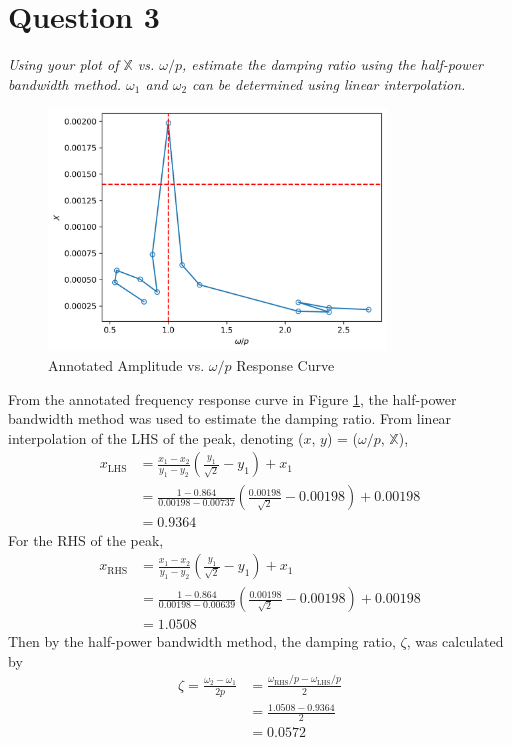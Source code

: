 \section{Question 3}
\textit{Using your plot of $\mathbb{X}$ vs. $\omega/p$, estimate the damping ratio using the half-power bandwidth method. $\omega_1$ and $\omega_2$ can be determined using linear interpolation.}
\begin{figure}[H]
    \centering
    \includegraphics[width=0.8\textwidth]{Questions/Plots/X_vs_omega_p_with_lines.png}
    \caption{Annotated Amplitude vs. $\omega/p$ Response Curve}
    \label{fig:frequency_response_curve_with_lines}
\end{figure}
From the annotated frequency response curve in Figure \ref{fig:frequency_response_curve_with_lines}, the half-power bandwidth method was used to estimate the damping ratio. From linear interpolation of the LHS of the peak, denoting ($x$, $y$) = ($\omega/p$, $\mathbb{X}$), 
\begin{align*}
    x_{\text{LHS}} &= \frac{x_1 - x_2}{y_1 - y_2} \left(\frac{y_1}{\sqrt{2}} - y_1\right) + x_1 \\
    &= \frac{1 - 0.864}{0.00198 - 0.00737} \left(\frac{0.00198}{\sqrt{2}} - 0.00198\right) + 0.00198 \\
    &= 0.9364 
\end{align*}
For the RHS of the peak,
\begin{align*}
    x_{\text{RHS}} &= \frac{x_1 - x_2}{y_1 - y_2} \left(\frac{y_1}{\sqrt{2}} - y_1\right) + x_1 \\
    &= \frac{1 - 0.864}{0.00198 - 0.00639} \left(\frac{0.00198}{\sqrt{2}} - 0.00198\right) + 0.00198 \\
    &= 1.0508
\end{align*}
Then by the half-power bandwidth method, the damping ratio, $\zeta$, was calculated by
\begin{align*}
    \zeta = \frac{\omega_2 - \omega_1}{2p} &= \frac{\omega_{\text{RHS}}/p - \omega_{\text{LHS}}/p}{2} \\
    &= \frac{1.0508 - 0.9364}{2} \\
    &= \boxed{0.0572}
\end{align*}

